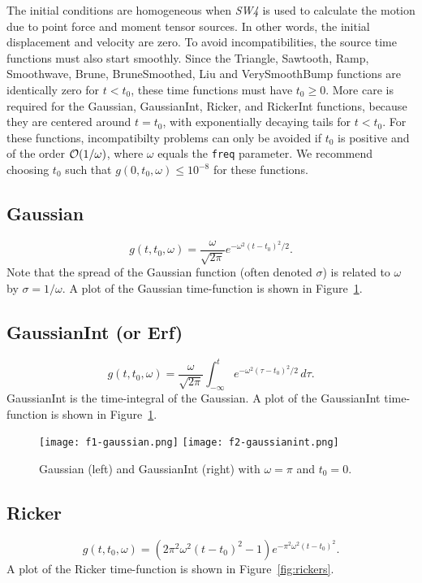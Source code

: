 \documentclass[11pt]{report}
\begin{document}
The initial conditions are homogeneous when \emph{SW4} is used to calculate the motion due to point
force and moment tensor sources. In other words, the initial displacement and velocity are zero. To
avoid incompatibilities, the source time functions must also start smoothly. Since the Triangle,
Sawtooth, Ramp, Smoothwave, Brune, BruneSmoothed, Liu and VerySmoothBump functions are identically
zero for $t<t_0$, these time functions must have $t_0\geq 0$. More care is required for the
Gaussian, GaussianInt, Ricker, and RickerInt functions, because they are centered around $t=t_0$,
with exponentially decaying tails for $t<t_0$. For these functions, incompatibilty problems can only
be avoided if $t_0$ is positive and of the order ${\cal O}(1/\omega)$, where $\omega$ equals the
{\tt freq} parameter. We recommend choosing $t_0$ such that $g(0,t_0,\omega) \leq 10^{-8}$ for these
functions.

\subsection{Gaussian}\label{gaussian}
  \[
  g(t,t_0,\omega) = \dfrac{\omega}{\sqrt{2 \pi}} e^{-\omega^2 (t - t_0)^2 /2}.
  \] 
Note that the spread of the Gaussian function (often denoted $\sigma$) is related to $\omega$ by
$\sigma = 1 / \omega$. A plot of the Gaussian time-function is shown in Figure~\ref{fig:gaussians}.

\subsection{GaussianInt (or Erf)}\label{gaussianint}
\[
g(t,t_0,\omega) = \dfrac{\omega}{\sqrt{2 \pi}} \int_{-\infty}^t e^{-\omega^2 (\tau - t_0)^2/2}\,d\tau.
\] 
GaussianInt is the time-integral of the Gaussian. A plot of the
GaussianInt time-function is shown in Figure~\ref{fig:gaussians}.
\begin{figure}
\begin{centering}
  \texttt{[image: f1-gaussian.png]}
  \texttt{[image: f2-gaussianint.png]}
  \caption{Gaussian (left) and GaussianInt (right) with $\omega=\pi$ and $t_0=0$.}
  \label{fig:gaussians}
\end{centering}
\end{figure}  
%
\subsection{Ricker} \label{ricker}
  \[
  g(t,t_0,\omega) = \left(2 \pi^2 \omega^2 (t - t_0)^2 - 1\right) e^{- \pi^2 \omega^2 (t - t_0)^2}.
  \]
A plot of the Ricker time-function is shown in Figure~\ref{fig:rickers}.
\end{document}
